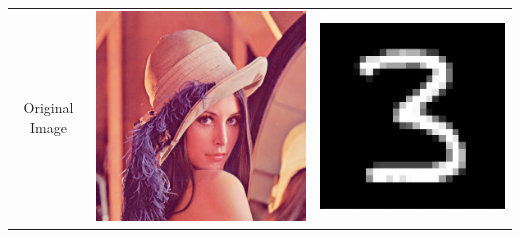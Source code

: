 \documentclass[11pt]{article}
\begin{document}
\begin{tabular}{c c c}
Original Image & \includegraphics[scale=.3]{Lenna.png} & \includegraphics[scale=.3]{3.png}\\

\end{tabular}
\end{document}
